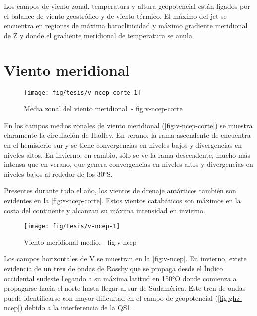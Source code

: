 \documentclass[spanish,a4paper]{book}
\begin{document}
Los campos de viento zonal, temperatura y altura geopotencial están
ligados por el balance de viento geostrófico y de viento térmico. El
máximo del jet se encuentra en regiones de máxima baroclinicidad y
máximo gradiente meridional de Z y donde el gradiente meridional de
temperatura se anula.


\section{Viento meridional}\label{viento-meridional}

\begin{figure}

{\centering \texttt{[image: fig/tesis/v-ncep-corte-1]} 

}

\caption{Media zonal del viento meridional. - fig:v-ncep-corte}\label{fig:v-ncep-corte}
\end{figure}

En los campos medios zonales de viento meridional
(\autoref{fig:v-ncep-corte}) se muestra claramente la circulación de
Hadley. En verano, la rama ascendente de encuentra en el hemisferio sur
y se tiene convergencias en niveles bajos y divergencias en niveles
altos. En invierno, en cambio, sólo se ve la rama descendente, mucho más
intensa que en verano, que genera convergencias en niveles altos y
divergencias en niveles bajos al rededor de los 30°S.

Presentes durante todo el año, los vientos de drenaje antárticos también
son evidentes en la \autoref{fig:v-ncep-corte}. Estos vientos
catabáticos son máximos en la costa del continente y alcanzan su máxima
intensidad en invierno.

\begin{figure}

{\centering \texttt{[image: fig/tesis/v-ncep-1]} 

}

\caption{Viento meridional medio. - fig:v-ncep}\label{fig:v-ncep}
\end{figure}

Los campos horizontales de V se muestran en la \autoref{fig:v-ncep}. En
invierno, existe evidencia de un tren de ondas de Rossby que se propaga
desde el Índico occidental sudeste llegando a su máxima latitud en 150°O
donde comienza a propagarse hacia el norte hasta llegar al sur de
Sudamérica. Este tren de ondas puede identificarse con mayor dificultad
en el campo de geopotencial (\autoref{fig:ghz-ncep}) debido a la
interferencia de la QS1.
\end{document}
